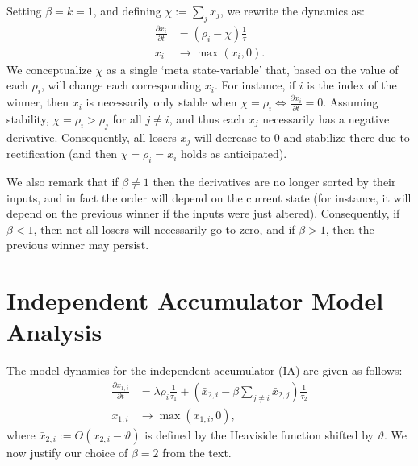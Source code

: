 \documentclass[a4paper]{article}
\begin{document}
Setting $\beta = k = 1$, and defining $\chi := \sum_{j} x_j$, we rewrite the dynamics as:
\begin{equation} \label{eq:um-special}
    \begin{split}
        \frac{{\partial x}_i}{\partial t} &= \left(\rho_i - \chi \right) \frac{1}{\tau} \\
        x_i &\rightarrow \max(x_i, 0) .
    \end{split}
\end{equation}
We conceptualize $\chi$ as a single `meta state-variable' that, based on the value of each $\rho_i$, will change each corresponding $x_i$.
For instance, if $i$ is the index of the winner, then $x_i$ is necessarily only stable when $\chi = \rho_i \iff \frac{{\partial x}_i}{\partial t} = 0$.
Assuming stability, $\chi = \rho_i > \rho_j$ for all $j \ne i$, and thus each $x_j$ necessarily has a negative derivative.
Consequently, all losers $x_j$ will decrease to 0 and stabilize there due to rectification (and then $\chi = \rho_i = x_i$ holds as anticipated).

We also remark that if $\beta \ne 1$ then the derivatives are no longer sorted by their inputs, and in fact the order will depend on the current state (for instance, it will depend on the previous winner if the inputs were just altered). Consequently, if $\beta < 1$, then not all losers will necessarily go to zero, and if $\beta > 1$, then the previous winner may persist.

\section{Independent Accumulator Model Analysis}

The model dynamics for the independent accumulator (IA) are given as follows:
\begin{equation}
    \begin{split}
        \frac{{\partial x}_{1,i}}{\partial t} &= \lambda \rho_i \frac{1}{\tau_1} + \left( 
            \bar{x}_{2,i} - \bar{\beta} \sum_{j \neq i} \bar{x}_{2,j} \right) \frac{1}{\tau_2} \\
        x_{1,i} &\rightarrow \max(x_{1,i}, 0) ,
    \end{split}
\end{equation}
where $\bar{x}_{2, i} := \Theta(x_{2,i} - \vartheta)$ is defined by the Heaviside function shifted by $\vartheta$.
We now justify our choice of $\bar{\beta} = 2$ from the text. %
\end{document}
